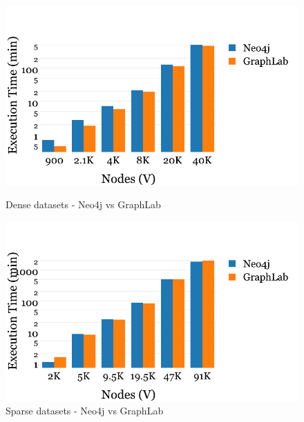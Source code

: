 	
	\begin{figure}
		\begin{minipage}{.5\textwidth}
			\centering
			\includegraphics[scale=0.5]{Graphs/dense-nodes.pdf}
			\caption{Dense datasets - Neo4j vs GraphLab\label{fig:dense-nodes}}
		\end{minipage}
		\begin{minipage}{.5\textwidth}
			\centering
			\includegraphics[scale=0.5]{Graphs/sparse-nodes.pdf}
			\caption{Sparse datasets - Neo4j vs GraphLab\label{fig:sparse-nodes}}
		\end{minipage}
	\end{figure}
	
